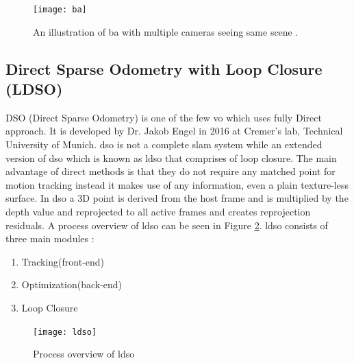 \begin{figure}[h]
	\centering
	\texttt{[image: ba]}
	\caption{An illustration of \acrshort{ba} with multiple cameras seeing same scene \cite{sfm}.}
	\label{fig:ba}
\end{figure}

\subsection{Direct Sparse Odometry with Loop Closure (LDSO)}
DSO (Direct Sparse Odometry) is one of the few \acrshort{vo} which uses fully Direct approach. It is developed by Dr. Jakob Engel in 2016 at Cremer's lab, Technical University of Munich. \acrshort{dso} is not a complete \acrshort{slam} system while an extended version of \acrshort{dso} which is known as \acrshort{ldso} \cite{gao2018ldso} that comprises of loop closure. The main advantage of direct methods is that they do not require any matched point for motion tracking instead it makes use of any information, even a plain texture-less surface. In \acrshort{dso} a 3D point is derived from the host frame and is multiplied by the depth value and reprojected to all active frames and creates reprojection residuals. A process overview of \acrshort{ldso} can be seen in Figure \ref{fig:ldso}. \acrshort{ldso} consists of three main modules :
\begin{enumerate}
	\item Tracking(front-end)
	\item Optimization(back-end)
	\item Loop Closure
\end{enumerate}
\begin{figure}[H]
	\centering
	\texttt{[image: ldso]}
	\caption{Process overview of \acrshort{ldso}}
	\label{fig:ldso}
\end{figure}
